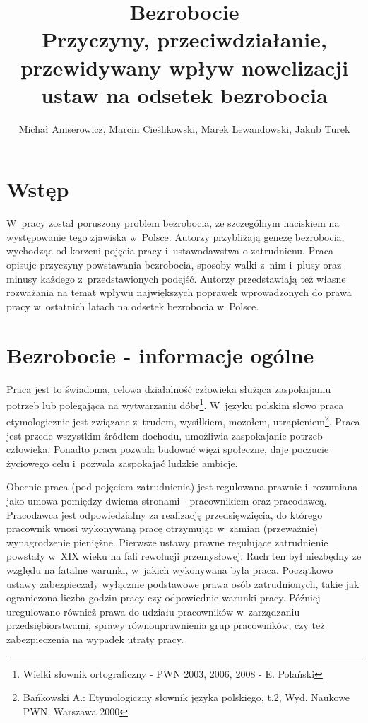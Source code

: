 \documentclass[12pt]{article}
\title{Bezrobocie \\ \Large{Przyczyny, przeciwdziałanie, przewidywany wpływ nowelizacji ustaw na odsetek bezrobocia}}
\author{Michał Aniserowicz, Marcin Cieślikowski, Marek Lewandowski, Jakub Turek}
\date{}
\begin{document}
    \maketitle
    
    \section*{Wstęp}
    
    W~pracy został poruszony problem bezrobocia, ze szczególnym naciskiem na występowanie tego zjawiska w~Polsce. Autorzy przybliżają genezę bezrobocia, wychodząc od korzeni pojęcia pracy i~ustawodawstwa o zatrudnienu. Praca opisuje przyczyny powstawania bezrobocia, sposoby walki z~nim i~plusy oraz minusy każdego z~przedstawionych podejść. Autorzy przedstawiają też własne rozważania na temat wpływu największych poprawek wprowadzonych do prawa pracy w~ostatnich latach na odsetek bezrobocia w~Polsce.
    
    \section*{Bezrobocie - informacje ogólne}
    
    Praca jest to świadoma, celowa działalność człowieka służąca zaspokajaniu potrzeb lub polegająca na wytwarzaniu dóbr\footnote{Wielki słownik ortograficzny - PWN 2003, 2006, 2008 - E. Polański}. W~języku polskim słowo praca etymologicznie jest związane z~trudem, wysiłkiem, mozołem, utrapieniem\footnote{Bańkowski A.: Etymologiczny słownik języka polskiego, t.2, Wyd. Naukowe PWN, Warszawa 2000}. Praca jest przede wszystkim źródłem dochodu, umożliwia zaspokajanie potrzeb człowieka. Ponadto praca pozwala budować więzi społeczne, daje poczucie życiowego celu i~pozwala zaspokajać ludzkie ambicje. 
    
    Obecnie praca (pod pojęciem zatrudnienia) jest regulowana prawnie i~rozumiana jako umowa pomiędzy dwiema stronami - pracownikiem oraz pracodawcą. Pracodawca jest odpowiedzialny za realizację przedsięwzięcia, do którego pracownik wnosi wykonywaną pracę otrzymując w~zamian (przeważnie) wynagrodzenie pieniężne. Pierwsze ustawy prawne regulujące zatrudnienie powstały w~XIX wieku na fali rewolucji przemysłowej. Ruch ten był niezbędny ze względu na fatalne warunki, w~jakich wykonywana była praca. Początkowo ustawy zabezpieczały wyłącznie podstawowe prawa osób zatrudnionych, takie jak ograniczona liczba godzin pracy czy odpowiednie warunki pracy. Później uregulowano również prawa do udziału pracowników w~zarządzaniu przedsiębiorstwami, sprawy równouprawnienia grup pracowników, czy też zabezpieczenia na wypadek utraty pracy.
    
\end{document}
